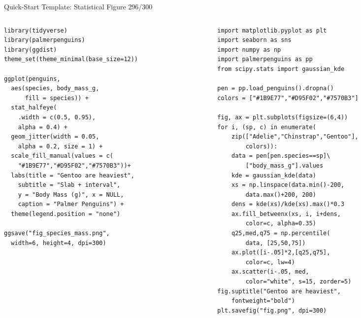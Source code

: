 \documentclass[10pt]{beamer}
\newcommand{\smark}[1]{\hfill{\scriptsize\color{codegray}#1}}
\begin{document}
\begin{frame}[fragile]{Quick-Start Template: Statistical Figure}
\smark{296/300}
\begin{columns}[T]
\begin{column}{0.48\textwidth}
\begin{lstlisting}[style=Rstyle,basicstyle=\ttfamily\tiny]
library(tidyverse)
library(palmerpenguins)
library(ggdist)
theme_set(theme_minimal(base_size=12))

ggplot(penguins,
  aes(species, body_mass_g,
      fill = species)) +
  stat_halfeye(
    .width = c(0.5, 0.95),
    alpha = 0.4) +
  geom_jitter(width = 0.05,
    alpha = 0.2, size = 1) +
  scale_fill_manual(values = c(
    "#1B9E77","#D95F02","#7570B3"))+
  labs(title = "Gentoo are heaviest",
    subtitle = "Slab + interval",
    y = "Body Mass (g)", x = NULL,
    caption = "Palmer Penguins") +
  theme(legend.position = "none")

ggsave("fig_species_mass.png",
  width=6, height=4, dpi=300)
\end{lstlisting}
\end{column}
\begin{column}{0.48\textwidth}
\begin{lstlisting}[style=Pystyle,basicstyle=\ttfamily\tiny]
import matplotlib.pyplot as plt
import seaborn as sns
import numpy as np
import palmerpenguins as pp
from scipy.stats import gaussian_kde

pen = pp.load_penguins().dropna()
colors = ["#1B9E77","#D95F02","#7570B3"]

fig, ax = plt.subplots(figsize=(6,4))
for i, (sp, c) in enumerate(
    zip(["Adelie","Chinstrap","Gentoo"],
        colors)):
    data = pen[pen.species==sp]\
        ["body_mass_g"].values
    kde = gaussian_kde(data)
    xs = np.linspace(data.min()-200,
        data.max()+200, 200)
    dens = kde(xs)/kde(xs).max()*0.3
    ax.fill_betweenx(xs, i, i+dens,
        color=c, alpha=0.35)
    q25,med,q75 = np.percentile(
        data, [25,50,75])
    ax.plot([i-.05]*2,[q25,q75],
        color=c, lw=4)
    ax.scatter(i-.05, med,
        color="white", s=15, zorder=5)
fig.suptitle("Gentoo are heaviest",
    fontweight="bold")
plt.savefig("fig.png", dpi=300)
\end{lstlisting}
\end{column}
\end{columns}
\end{frame}
\end{document}
